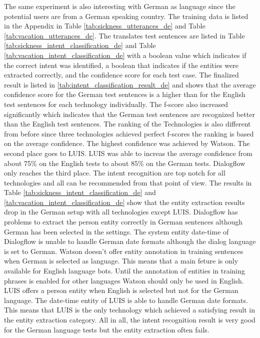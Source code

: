 The same experiment is also interesting with German as language since the potential 
users are from a German speaking country.
The training data is listed in the Appendix in Table \ref{tab:sickness_utterances_de} and 
Table \ref{tab:vacation_utterances_de}.
The translates test sentences are listed in Table \ref{tab:sickness_intent_classification_de} 
and Table \ref{tab:vacation_intent_classification_de} with a boolean value which indicates if the 
correct intent was identified, a boolean that indicates if the entities were extracted correctly,
and the confidence score for each test case.
The finalized result is listed in \ref{tab:intent_classification_result_de} and shows 
that the average confidence score for the German test sentences is a higher than 
for the English test sentences for each technology individually.
The f-score also increased significantly which indicates that the German test sentences are 
recognized better than the English test sentences.
The ranking of the Technologies is also different from before since three technologies 
achieved perfect f-scores the ranking is based on the average confidence.
The highest confidence was achieved by Watson.
The second place goes to LUIS.
LUIS was able to increas the average confidence from about 75\% on the English tests 
to about 85\% on the German tests.
Dialogflow only reaches the third place.
The intent recognition are top notch for all technologies and all can be recommended from that 
point of view.
The results in Table \ref{tab:sickness_intent_classification_de} and \ref{tab:vacation_intent_classification_de} 
show that the entity extraction results drop in the German setup with all technologies except LUIS.
Dialogflow has problems to extract the person entity correctly in German sentences although German 
has been selected in the settings. 
The system entity date-time of Dialogflow is unable to handle German date formats although 
the dialog language is set to German.
Watson doesn't offer entity annotation in training sentences when German is selected as language.
This means that a main feture is only available for English language bots.
Until the annotation of entities in training phrases is enabled for other languages Watson should only be 
used in English.
LUIS offers a person entity when English is selected but not for the German language.
The date-time entity of LUIS is able to handle German date formats. 
This means that LUIS is the only technology which achieved a satisfying result in the entity extraction category.
All in all, the intent recognition result is very good for the German language tests but the entity extraction 
often fails.






